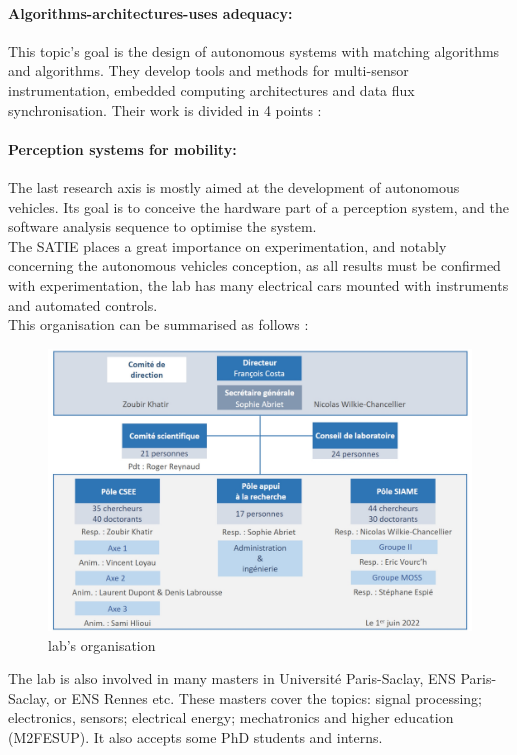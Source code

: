 \documentclass[titlepage]{article}
\begin{document}
	\paragraph{Algorithms-architectures-uses adequacy:} This topic's goal is the design of autonomous systems with matching algorithms and algorithms. They develop tools and methods for multi-sensor instrumentation, embedded computing architectures and data flux synchronisation. Their work is divided in 4 points :
	
	\paragraph{Perception systems for mobility:} The last research axis is mostly aimed at the development of autonomous vehicles. Its goal is to conceive the hardware part of a perception system, and the software analysis sequence to optimise the system. \\
	
	The SATIE places a great importance on experimentation, and notably concerning the autonomous vehicles conception, as all results must be confirmed with experimentation, the lab has many electrical cars mounted with instruments and automated controls. \\
	
	This organisation can be summarised as follows :
	
	\begin{figure}[H]
		\centering
		\includegraphics[width=.7\linewidth]{src/satie_org}
		\caption{lab's organisation}
	\end{figure}

	The lab is also involved in many masters in Université Paris-Saclay, ENS Paris-Saclay, or ENS Rennes etc. These masters cover the topics: signal processing; electronics, sensors; electrical energy; mechatronics and higher education (M2FESUP). It also accepts some PhD students and interns.
	
\end{document}
